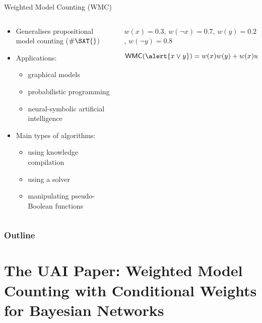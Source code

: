 \documentclass{beamer}
\begin{document}
\begin{frame}[fragile]{Weighted Model Counting (WMC)}
  \begin{columns}
    \begin{column}{0.5\textwidth}
      \begin{itemize}
      \item Generalises propositional model counting ($\#\SAT{}$)
      \item Applications:
        \begin{itemize}
        \item graphical models
        \item probabilistic programming
        \item neural-symbolic artificial intelligence
        \end{itemize}
      \item Main types of algorithms:
        \begin{itemize}
        \item using knowledge compilation
        \item using a \SAT{} solver
        \item manipulating pseudo-Boolean functions
        \end{itemize}
      \end{itemize}
    \end{column}
    \begin{column}{0.5\textwidth}
      \begin{example}
      $w(x) = 0.3$, $w(\neg x) = 0.7$, $w(y) = 0.2$, $w(\neg y) = 0.8$
      \vspace{1cm}

      $\mathsf{WMC}(\alert{x \lor y}) = w(x)w(y) + w(x)w(\neg y) + w(\neg x)w(y)
      = 0.44$
      \end{example}
    \end{column}
  \end{columns}
\end{frame}

\begin{frame}
  \frametitle{Outline}
  \tableofcontents
\end{frame}

\section{The UAI Paper: Weighted Model Counting with Conditional Weights for Bayesian Networks}
\end{document}
